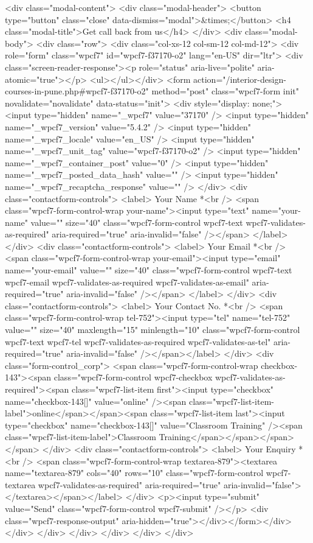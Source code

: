 {<div class="modal-content">
<div class="modal-header">
<button type="button" class="close" data-dismiss="modal">&times;</button>
<h4 class="modal-title">Get call back from us</h4>
</div>
<div class="modal-body">
<div class="row">
<div class="col-xs-12 col-sm-12 col-md-12">
<div role="form" class="wpcf7" id="wpcf7-f37170-o2" lang="en-US" dir="ltr">
<div class="screen-reader-response"><p role="status" aria-live="polite" aria-atomic="true"></p> <ul></ul></div>
<form action="/interior-design-courses-in-pune.php#wpcf7-f37170-o2" method="post" class="wpcf7-form init" novalidate="novalidate" data-status="init">
<div style="display: none;">
<input type="hidden" name="_wpcf7" value="37170" />
<input type="hidden" name="_wpcf7_version" value="5.4.2" />
<input type="hidden" name="_wpcf7_locale" value="en_US" />
<input type="hidden" name="_wpcf7_unit_tag" value="wpcf7-f37170-o2" />
<input type="hidden" name="_wpcf7_container_post" value="0" />
<input type="hidden" name="_wpcf7_posted_data_hash" value="" />
<input type="hidden" name="_wpcf7_recaptcha_response" value="" />
</div>
<div class="contactform-controls">
<label> Your Name *<br />
<span class="wpcf7-form-control-wrap your-name"><input type="text" name="your-name" value="" size="40" class="wpcf7-form-control wpcf7-text wpcf7-validates-as-required" aria-required="true" aria-invalid="false" /></span> </label>
</div>
<div class="contactform-controls">
<label> Your Email *<br />
<span class="wpcf7-form-control-wrap your-email"><input type="email" name="your-email" value="" size="40" class="wpcf7-form-control wpcf7-text wpcf7-email wpcf7-validates-as-required wpcf7-validates-as-email" aria-required="true" aria-invalid="false" /></span> </label>
</div>
<div class="contactform-controls">
<label> Your Contact No. *<br />
<span class="wpcf7-form-control-wrap tel-752"><input type="tel" name="tel-752" value="" size="40" maxlength="15" minlength="10" class="wpcf7-form-control wpcf7-text wpcf7-tel wpcf7-validates-as-required wpcf7-validates-as-tel" aria-required="true" aria-invalid="false" /></span></label>
</div>
<div class="form-control_corp">
<span class="wpcf7-form-control-wrap checkbox-143"><span class="wpcf7-form-control wpcf7-checkbox wpcf7-validates-as-required"><span class="wpcf7-list-item first"><input type="checkbox" name="checkbox-143[]" value="online" /><span class="wpcf7-list-item-label">online</span></span><span class="wpcf7-list-item last"><input type="checkbox" name="checkbox-143[]" value="Classroom Training" /><span class="wpcf7-list-item-label">Classroom Training</span></span></span></span>
</div>
<div class="contactform-controls">
<label> Your Enquiry *<br />
<span class="wpcf7-form-control-wrap textarea-879"><textarea name="textarea-879" cols="40" rows="10" class="wpcf7-form-control wpcf7-textarea wpcf7-validates-as-required" aria-required="true" aria-invalid="false"></textarea></span></label>
</div>
<p><input type="submit" value="Send" class="wpcf7-form-control wpcf7-submit" /></p>
<div class="wpcf7-response-output" aria-hidden="true"></div></form></div> </div>
</div>
</div>
</div>
</div>
</div>

}
